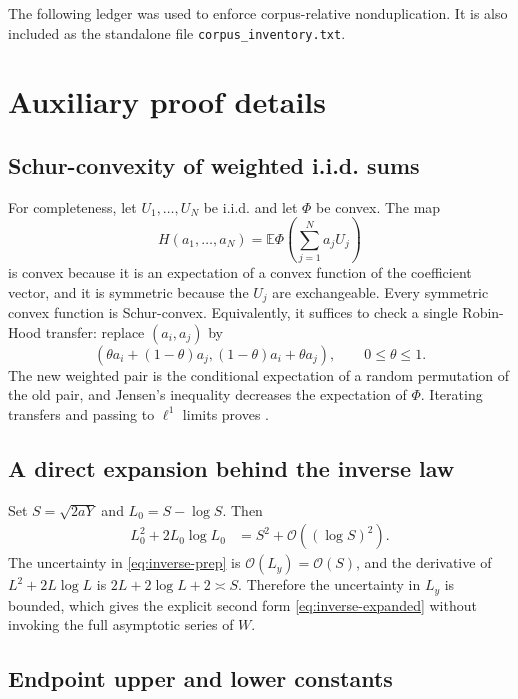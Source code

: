 \documentclass[11pt,oneside]{article}
\theoremstyle{definition}
\theoremstyle{remark}
\newcommand{\E}{\mathbb E}
\newcommand{\bigO}{\mathcal O}
\begin{document}
The following ledger was used to enforce corpus-relative nonduplication.  It is also included
as the standalone file \texttt{corpus\_inventory.txt}.



\section{Auxiliary proof details}
\label{app:proofs}

\subsection{Schur-convexity of weighted i.i.d. sums}

For completeness, let $U_1,\ldots,U_N$ be i.i.d. and let $\Phi$ be convex.  The map
\[
 H(a_1,\ldots,a_N)=\E\Phi\!\left(\sum_{j=1}^Na_jU_j\right)
\]
is convex because it is an expectation of a convex function of the coefficient vector, and
it is symmetric because the $U_j$ are exchangeable.  Every symmetric convex function is
Schur-convex.  Equivalently, it suffices to check a single Robin-Hood transfer:
replace $(a_i,a_j)$ by
\[
 (\theta a_i+(1-\theta)a_j,
  (1-\theta)a_i+\theta a_j),
 \qquad 0\le\theta\le1.
\]
The new weighted pair is the conditional expectation of a random permutation of the old
pair, and Jensen's inequality decreases the expectation of $\Phi$.  Iterating transfers and
passing to $\ell^1$ limits proves .

\subsection{A direct expansion behind the inverse law}

Set $S=\sqrt{2aY}$ and $L_0=S-\log S$.  Then
\begin{align*}
 L_0^2+2L_0\log L_0
 &=S^2+\bigO((\log S)^2).
\end{align*}
The uncertainty in \eqref{eq:inverse-prep} is $\bigO(L_y)=\bigO(S)$, and the derivative of
$L^2+2L\log L$ is $2L+2\log L+2\asymp S$.  Therefore the uncertainty in $L_y$ is bounded,
which gives the explicit second form \eqref{eq:inverse-expanded} without invoking the full
asymptotic series of $W$.

\subsection{Endpoint upper and lower constants}
\end{document}

